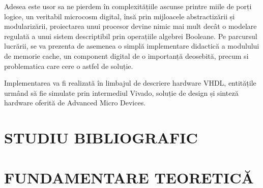 \documentclass[12pt]{article}
\begin{document}
Adesea este usor sa ne pierdem în complexitățiile ascunse printre miile de porți logice, un veritabil microcosm digital, însă prin mijloacele abstractizării și modularizării, proiectarea unui procesor devine nimic mai mult decât o modelare regulată a unui sistem descriptibil prin operațiile algebrei Booleane. Pe parcursul lucrării, se va prezenta de asemenea o simplă implementare didactică a modulului de memorie cache, un component digital de o importanță deosebită, precum si problematica care cere o astfel de soluție.

Implementarea va fi realizată în limbajul de descriere hardware VHDL, entitățile urmând să fie simulate prin intermediul Vivado, soluție de design și sinteză hardware oferită de Advanced Micro Devices.


\newpage
\section{\centering STUDIU BIBLIOGRAFIC}


\newpage
\section{\centering FUNDAMENTARE TEORETICĂ}
\end{document}
